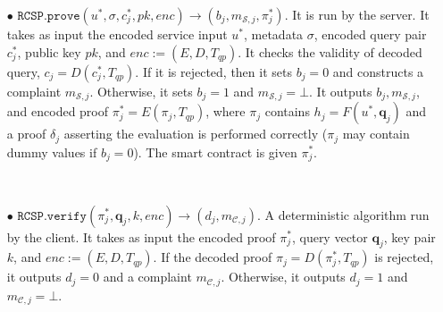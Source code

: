 \begin{definition}[RC-S-P Scheme]
\begin{itemize}

\

\item[$\bullet$] $\mathtt{RCSP}.\mathtt{prove}(u^{\scriptscriptstyle *},  \sigma,  c^{\scriptscriptstyle *}_{\scriptscriptstyle j},pk, enc)\rightarrow (b_{\scriptscriptstyle j},m_{\scriptscriptstyle \mathcal{S},j},\pi^{\scriptscriptstyle *}_{\scriptscriptstyle j})$. It is run by the server. It  takes as input the encoded service input $u^{\scriptscriptstyle *}$, metadata $\sigma$,   encoded query pair $c^{\scriptscriptstyle *}_{\scriptscriptstyle j}$, public key $pk$,  and $enc:=(E,D,T_{\scriptscriptstyle qp})$.  It checks the validity of decoded query, $c_{\scriptscriptstyle j}=D(c^{\scriptscriptstyle *}_{\scriptscriptstyle j},T_{\scriptscriptstyle qp})$.  If it is rejected, then it sets $b_{\scriptscriptstyle j}=0$ and constructs a complaint $m_{\scriptscriptstyle \mathcal{S},j}$. Otherwise,  it   sets $b_{\scriptscriptstyle j}=1$ and $m_{\scriptscriptstyle \mathcal{S},j}=\bot$. It outputs $b_{\scriptscriptstyle j},m_{\scriptscriptstyle \mathcal{S},j}$,   and  encoded proof $\pi^{\scriptscriptstyle *}_{\scriptscriptstyle j}=E(\pi_{\scriptscriptstyle j},T_{\scriptscriptstyle qp})$, where  $\pi_{\scriptscriptstyle j}$ contains $h_{\scriptscriptstyle j}=F(u^{\scriptscriptstyle *},\bm{q}_{\scriptscriptstyle j})$ and a proof $\delta_{\scriptscriptstyle j}$  asserting the evaluation is performed correctly ($\pi_{\scriptscriptstyle j}$ may contain dummy values if $b_{\scriptscriptstyle j}=0$). The smart contract is given $\pi^{\scriptscriptstyle *}_{\scriptscriptstyle j}$.




\

\item[$\bullet$] $\mathtt{RCSP}.\mathtt{verify}(\pi^{\scriptscriptstyle *}_{\scriptscriptstyle j}, \bm{q}_{\scriptscriptstyle j},k,enc)\rightarrow (d_{\scriptscriptstyle j},m_{\scriptscriptstyle \mathcal{C},j})$. A deterministic algorithm run by the client. It takes as input the encoded proof $\pi^{\scriptscriptstyle *}_{\scriptscriptstyle j}$,  query vector $\bm{q}_{\scriptscriptstyle j}$, key pair $k$,  and $enc:=(E,D,T_{\scriptscriptstyle qp})$. If the decoded proof $\pi_{\scriptscriptstyle j}=D(\pi^{\scriptscriptstyle *}_{\scriptscriptstyle j},T_{\scriptscriptstyle qp})$ is rejected,  it outputs $d_{\scriptscriptstyle j}=0$ and a complaint $m_{\scriptscriptstyle \mathcal{C},j}$. Otherwise, it outputs  $d_{\scriptscriptstyle j}=1$ and $m_{\scriptscriptstyle \mathcal{C},j}=\bot$.





\end{itemize}
\end{definition}
